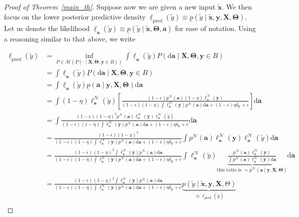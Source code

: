 \documentclass[12pt, english, oneside, a4paper]{article}
\newcommand{\y}{\boldsymbol{y}}
\newcommand{\X}{\boldsymbol{X}}
\newcommand{\x}{\boldsymbol{x}}
\renewcommand{\a}{\boldsymbol{a}}
\newcommand{\bT}{\boldsymbol{\Theta}}
\begin{document}
\begin{proof}[Proof of Theorem~\ref{main_th}]
Suppose now we are given a new input $\tilde{\x}$. We then focus on the lower posterior predictive density $\underline{\ell}_\text{pred}(\tilde{y})\equiv \underline{p}(\tilde{y} \mid \tilde{\x},\y,\X,\bT)$. Let us denote the likelihood $\underline{\ell}_{\a}(\tilde{y}) \equiv \underline{p}(\tilde{y} \mid \tilde{\x}, \bT,\a)$ for ease of notation. Using a reasoning similar to that above, we write 

\begin{align}
   \underline{\ell}_\text{pred}(\tilde{y}) &= \inf_{P \in \mathcal{M}(\underline{P}(\cdot \mid \X,\bT,\y\in B))} \int \underline{\ell}_{\a}(\tilde{y}) P(\text{d}\a \mid \X,\bT,\y\in B) \nonumber\\
   &= \int \underline{\ell}_{\a}(\tilde{y}) \underline{P}(\text{d}\a \mid \X,\bT,\y\in B) \label{first-part2}\\
   &= \int \underline{\ell}_{\a}(\tilde{y}) \underline{p}(\a \mid \y, \X,\bT) \text{d}\a \label{second-part2}\\
   &=\int (1-\eta) \ell^\mathcal{N}_{\a}(\tilde{y})
\left[ \frac{(1-\epsilon)p^\mathcal{N}(\a) (1-\eta) \ell^\mathcal{N}_{\a}(\y)}{(1-\epsilon)(1-\eta)\int \ell^\mathcal{N}_{\a}(\y) p^\mathcal{N}(\a) \text{d}\a + (1-\epsilon)\eta \delta_{\y} + c} \right] \text{d}\a \nonumber\\
   &= \int \frac{(1-\epsilon)(1-\eta)^2 p^\mathcal{N}(\a) \ell^\mathcal{N}_{\a}(\y) \ell^\mathcal{N}_{\a}(\tilde{y})}{(1-\epsilon)(1-\eta)\int \ell^\mathcal{N}_{\a}(\y) p^\mathcal{N}(\a) \text{d}\a +  (1-\epsilon)\eta \delta_{\y} + c} \text{d}\a \nonumber\\
   &= \frac{(1-\epsilon)(1-\eta)^2}{(1-\epsilon)(1-\eta)\int \ell^\mathcal{N}_{\a}(\y) p^\mathcal{N}(\a) \text{d}\a +  (1-\epsilon)\eta \delta_{\y} + c} \int p^\mathcal{N}(\a) \ell^\mathcal{N}_{\a}(\y) \ell^\mathcal{N}_{\a}(\tilde{y}) \text{d}\a \nonumber\\
   &= \frac{(1-\epsilon)(1-\eta)^2 \int \ell^\mathcal{N}_{\a}(\y) p^\mathcal{N}(\a) \text{d}\a}{(1-\epsilon)(1-\eta)\int \ell^\mathcal{N}_{\a}(\y) p^\mathcal{N}(\a) \text{d}\a +  (1-\epsilon)\eta \delta_{\y} + c} \int \ell^\mathcal{N}_{\a}(\tilde{y}) \underbrace{\frac{p^\mathcal{N}(\a) \ell^\mathcal{N}_{\a}(\y)}{\int p^\mathcal{N}(\a) \ell^\mathcal{N}_{\a}(\y) \text{d}\a}}_{\text{this ratio is }=p^\mathcal{N}(\a \mid \y, \X,\bT)}  \text{d}\a \label{third-part2}\\
   &= \frac{(1-\epsilon)(1-\eta)^2 \int \ell^\mathcal{N}_{\a}(\y) p^\mathcal{N}(\a) \text{d}\a}{(1-\epsilon)(1-\eta)\int \ell^\mathcal{N}_{\a}(\y) p^\mathcal{N}(\a) \text{d}\a +  (1-\epsilon)\eta \delta_{\y} + c} \underbrace{p(\tilde{y} \mid \tilde{\x},\y,\X,\Theta)}_{\equiv \ell_\text{pred}(\tilde{y})} \label{fourth-part2}\\

\end{align}
\end{proof}
\end{document}
